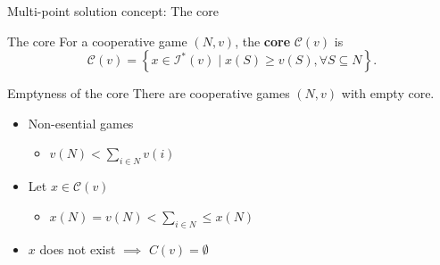 \documentclass{beamer}
\newcommand{\I}{\mathcal{I}}
\begin{document}


\begin{frame}{Multi-point solution concept: The core}
    \begin{block}{The core}
    For a cooperative game $(N,v)$, the \textbf{core} $\mathcal{C}(v)$ is
    \[\mathcal{C}(v) = \left\{x \in \I^*(v) \mid x(S) \geq v(S), \forall S \subseteq N \right\}.\]
    \end{block}
    \begin{block}{Emptyness of the core}
        There are cooperative games $\left(N,v\right)$ with empty core.
    \end{block}
    \begin{itemize}
        \item Non-esential games
        \begin{itemize}
            \item $v\left(N\right) < \sum_{i \in N}v\left(i\right)$
        \end{itemize}
        \item Let $x \in \mathcal{C}\left(v\right)$
        \begin{itemize}
            \item $x\left(N\right)=v\left(N\right)<\sum_{i\in N}\leq x\left(N\right)$ 
        \end{itemize}
        \item $x$ does not exist $\implies$ $C\left(v\right)=\emptyset$
    \end{itemize}
\end{frame}


\end{document}
